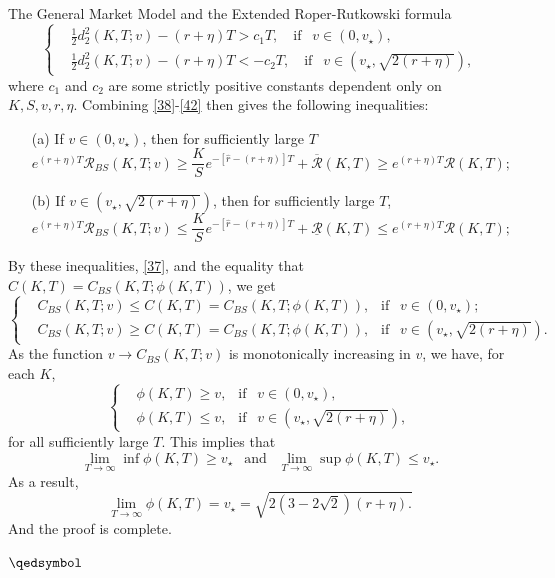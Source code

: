 \documentclass[unknownkeysallowed, compress]{beamer}
\theoremstyle{plain}
\begin{document}
\begin{frame}[allowframebreaks]{The General Market Model and the Extended Roper-Rutkowski formula}
\begin{equation}\label{42}
\left\{
\begin{split}
&\frac{1}{2}d_2^2(K,T;v) - (r+\eta)T>c_1T,~~~\mbox{  if  }~~ v\in (0,v_\star),\\
&\frac{1}{2}d_2^2(K,T;v) - (r+\eta)T<-c_2T,~~~\mbox{  if  }~~ v\in (v_\star,\sqrt{2(r+\eta)}),
\end{split}
\right.
\end{equation}
where $c_1$ and $c_2$ are some strictly positive constants dependent only on $K, S, v, r, \eta$. Combining \eqref{38}-\eqref{42} then gives the following inequalities:
\begin{enumerate}
\item[(a)] If $v\in(0,v_\star)$, then for sufficiently large $T$
\small
$$
e^{(r+\eta)T}\mathcal{R}_{BS}(K,T;v)\geq\frac{K}{S}e^{-[\hat{r} - (r+\eta)]T}+\overline{\mathcal{R}}(K,T)\geq e^{(r+\eta)T}\mathcal{R}(K,T);
$$
\normalsize
\item[(b)] If $v\in (v_\star,\sqrt{2(r+\eta)})$, then for sufficiently large $T$,
\small 
$$
e^{(r+\eta)T}\mathcal{R}_{BS}(K,T;v)\leq\frac{K}{S}e^{-[\hat{r} - (r+\eta)]T}+\underline{\mathcal{R}}(K,T)\leq e^{(r+\eta)T}\mathcal{R}(K,T);
$$
\normalsize 
\end{enumerate}
By these inequalities, \eqref{37}, and the equality that $C(K,T) = C_{BS}(K,T;\phi(K,T))$, we get
\small
\begin{equation*}
\left\{
\begin{split}
&C_{BS}(K,T;v)\leq C(K,T) = C_{BS}(K,T;\phi(K,T)),~~\mbox{  if  }~~v\in (0,v_\star);\\
&C_{BS}(K,T;v)\geq C(K,T) = C_{BS}(K,T;\phi(K,T)),~~\mbox{  if  }~~v\in (v_\star,\sqrt{2(r+\eta)}).
\end{split}
\right.
\end{equation*}
\normalsize 
As the function $v\rightarrow C_{BS}(K,T;v)$ is monotonically increasing in $v$, we have, for each $K$,
\begin{equation*}
\left\{
\begin{split}
&\phi(K,T)\geq v,~~\mbox{  if  }~~ v\in(0,v_\star),\\
&\phi(K,T)\leq v,~~\mbox{  if  }~~ v\in(v_\star,\sqrt{2(r+\eta)}),
\end{split}
\right.
\end{equation*}
for all sufficiently large $T$. This implies that
$$
\lim_{T\rightarrow\infty}\inf\phi(K,T)\geq v_\star~~\mbox{  and  }~~\lim_{T\rightarrow\infty}\sup\phi(K,T)\leq v_\star.
$$
As a result,
$$
\lim_{T\rightarrow \infty}\phi(K,T) = v_\star = \sqrt{2(3 - 2\sqrt{2})(r+\eta).}
$$
And the proof is complete.
\begin{flushright}
$\qedsymbol$
\end{flushright}
\end{frame}
\end{document}
